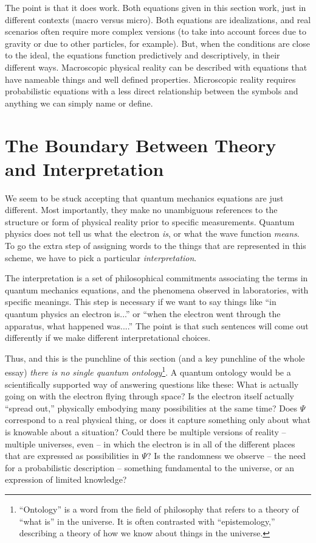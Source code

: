 \documentclass[onecolumn,preprintnumbers,amsmath,amssymbn,reprint,nofootinbib,superscriptaddress]{revtex4}    %
\begin{document}
The point is that it does work.  Both equations given in this section work, just in different contexts (macro versus micro).  Both equations are idealizations, and real scenarios often require more complex versions (to take into account forces due to gravity or due to other particles, for example).  But, when the conditions are close to the ideal, the equations function predictively and descriptively, in their different ways.  Macroscopic physical reality can be described with equations that have nameable things and well defined properties.  Microscopic reality requires probabilistic equations with a less direct relationship between the symbols and anything we can simply name or define.  

\section{The Boundary Between Theory and Interpretation} 

We seem to be stuck accepting that quantum mechanics equations are just different.  Most importantly, they make no unambiguous references to the structure or form of physical reality prior to specific measurements. Quantum physics does not tell us what the electron {\em is}, or what the wave function {\em means}.  To go the extra step of assigning words to the things that are represented in this scheme, we have to pick a particular {\em interpretation}. 

The interpretation is a set of philosophical commitments associating the terms in quantum mechanics equations, and the phenomena observed in laboratories, with specific meanings.  This step is necessary if we want to say things like ``in quantum physics an electron is...'' or ``when the electron went through the apparatus, what happened was....''  The point is that such sentences will come out differently if we make different interpretational choices.  

Thus, and this is the punchline of this section (and a key punchline of the whole essay) {\em there is no single quantum ontology}\footnote{``Ontology'' is a word from the field of philosophy that refers to a theory of ``what is'' in the universe.  It is often contrasted with ``epistemology,'' describing a theory of how we know about things in the universe.}. A quantum ontology would be a scientifically supported way of answering questions like these:  What is actually going on with the electron flying through space?  Is the electron itself actually ``spread out,'' physically embodying many possibilities at the same time? Does $\Psi$ correspond to a real physical thing, or does it capture something only about what is knowable about a situation?  Could there be multiple versions of reality -- multiple universes, even -- in which the electron is in all of the different places that are expressed as possibilities in $\Psi$?  Is the randomness we observe -- the need for a probabilistic description -- something fundamental to the universe, or an expression of limited knowledge?  
\end{document}
